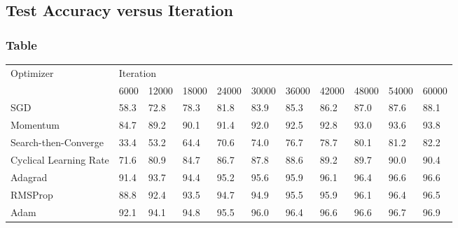 \documentclass{article}
\begin{document}
\subsection{Test Accuracy versus Iteration}
\subsubsection{Table}

	\begin{table}[H]
		\hskip-2.0cm\begin{tabular}{@{}|l|l|l|l|l|l|l|l|l|l|l|@{}}
			\toprule
			\multirow{2}{*}{Optimizer} & \multicolumn{10}{l|}{Iteration}                                              \\ \cmidrule(l){2-11} 
			& 6000 & 12000 & 18000 & 24000 & 30000 & 36000 & 42000 & 48000 & 54000 & 60000 \\ \midrule
			SGD                        & 58.3 & 72.8  & 78.3  & 81.8  & 83.9  & 85.3  & 86.2  & 87.0  & 87.6  & 88.1  \\ \midrule
			Momentum                   & 84.7 & 89.2  & 90.1  & 91.4  & 92.0  & 92.5  & 92.8  & 93.0  & 93.6  & 93.8  \\ \midrule
			Search-then-Converge       & 33.4 & 53.2  & 64.4  & 70.6  & 74.0  & 76.7  & 78.7  & 80.1  & 81.2  & 82.2  \\ \midrule
			Cyclical Learning Rate     & 71.6 & 80.9  & 84.7  & 86.7  & 87.8  & 88.6  & 89.2  & 89.7  & 90.0  & 90.4  \\ \midrule
			Adagrad                    & 91.4 & 93.7  & 94.4  & 95.2  & 95.6  & 95.9  & 96.1  & 96.4  &  96.6 & 96.6  \\ \midrule
			RMSProp                    & 88.8 & 92.4  & 93.5  & 94.7  & 94.9  & 95.5  & 95.9  & 96.1  & 96.4  & 96.5  \\ \midrule
			Adam                       & 92.1 & 94.1  & 94.8  & 95.5  & 96.0  & 96.4  & 96.6  & 96.6  & 96.7  & 96.9  \\ \bottomrule
		\end{tabular}
	
	\end{table}
	
\end{document}
